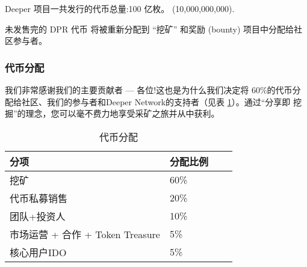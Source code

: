 \documentclass[a4paper]{article}
\begin{document}
\noindent Deeper 项目一共发行的代币总量:100 亿枚。 (10,000,000,000).

\noindent 未发售完的 DPR 代币 将被重新分配到 “挖矿” 和奖励 (bounty) 项目中分配给社区参与者。

\subsubsection{代币分配}

我们非常感谢我们的主要贡献者 --- 各位!这也是为什么我们决定将 60\%的代币分配给社区、我们的参与者和Deeper Network的支持者（见表 \ref{tab:token-matrix}）。通过“分享即 挖掘”的理念，您可以毫不费力地享受采矿之旅并从中获利。

\begin{table} [hh]
\centering
\begin{tabular}{|l|l|l|p{9cm}|}
\hline
分项 & 分配比例 \\ \hline
挖矿 & 60\% \\ \hline
代币私募销售 & 20\% \\ \hline
团队+投资人 & 10\%	\\ \hline

市场运营 + 合作 + Token Treasure & 5\% \\ \hline
核心用户IDO & 5\% \\ \hline
\end{tabular}
\caption{代币分配} \label{tab:token-matrix}
\end{table}
\end{document}
